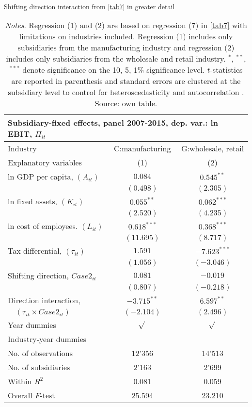 \documentclass[10pt,twocolumn,oneside,cmyk]{article}
\begin{document}
\begin{table}[t]
\footnotesize
 \begin{center}
  \caption{Shifting direction interaction from \cref{tab7} in greater detail}\label{tab20}
   \begin{tabularx}{\linewidth}{l c c}
   \toprule
   \multicolumn{3}{l}{Subsidiary-fixed effects, panel 2007-2015, dep. var.: ln EBIT, $\Pi_{it}$}\\
   \midrule
   Industry &C:manufacturing &G:wholesale, retail\\
   \cmidrule(lr){1-1}
   \cmidrule(lr){2-3}
   Explanatory variables &(1) &(2)\\
   \midrule
   ln GDP per capita, $(A_{it})$ &$0.084$ &$0.545^{**}$\\
   &$(0.498)$ &$(2.305)$\\
   ln fixed assets, $(K_{it})$ &$0.055^{**}$ &$0.062^{***}$\\
   &$(2.520)$ &$(4.235)$\\
   ln cost of employees. $(L_{it})$ &$0.618^{***}$ &$0.368^{***}$\\
   &$(11.695)$ &$(8.717)$\\
   Tax differential, $(\tau_{it})$ &$1.591$ &$-7.623^{***}$\\
   &$(1.056)$ &$(-3.046)$\\
   Shifting direction, $Case2_{it}$ &$0.081$ &$-0.019$\\
   &$(0.807)$ &$(-0.218)$\\
   Direction interaction, &$-3.715^{**}$ &$6.597^{**}$\\
   $\quad (\tau_{it}\times Case2_{it})$ &$(-2.104)$ &$(2.496)$\\
   Year dummies &$\sqrt{}$ &$\sqrt{}$\\
   Industry-year dummies & &\\
   No. of observations &12'356 &14'513\\
   No. of subsidiaries &2'163 &2'699\\
   Within $R^2$ &0.081 &0.059\\
   Overall $F$-test &25.594 &23.210\\
   \bottomrule
   \end{tabularx} 
  \caption*{\footnotesize{\textit{Notes}. Regression (1) and (2) are based on regression (7) in \cref{tab7} with limitations on industries included. Regression (1) includes only subsidiaries from the manufacturing industry and regression (2) includes only subsidiaries from the wholesale and retail industry. $^*$, $^{**}$, $^{***}$ denote significance on the 10, 5, 1\% significance level. $t$-statistics are reported in parenthesis and standard errors are clustered at the subsidiary level to control for heteroscedasticity and autocorrelation \parencite[285]{hoechle_robust_2007}. Source: own table.}}
 \end{center}
\end{table}
\end{document}
